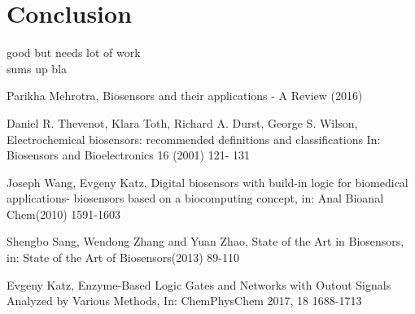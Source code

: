 \documentclass[runningheads]{llncs}
\begin{document}
\section{Conclusion}
	good but needs lot of work\\
	sums up bla


\begin{thebibliography}{8}
	Parikha Mehrotra, Biosensors and their applications - A Review (2016)
	
	Daniel R. Thevenot, Klara Toth, Richard A. Durst, George S. Wilson, Electrochemical biosensors: recommended definitions and classifications In: Biosensors and Bioelectronics 16 (2001) 121- 131
	
	Joseph Wang, Evgeny Katz, Digital biosensors with build-in logic for biomedical applications- biosensors based on a biocomputing concept, in: Anal Bioanal Chem(2010) 1591-1603
	
	Shengbo Sang, Wendong Zhang and Yuan Zhao, State of the Art in Biosensors, in: State of the Art of Biosensors(2013) 89-110
	
	Evgeny Katz, Enzyme-Based Logic Gates and Networks with Outout Signals Analyzed by Various Methods, In: ChemPhysChem 2017, 18 1688-1713
	
\end{thebibliography}
\end{document}
